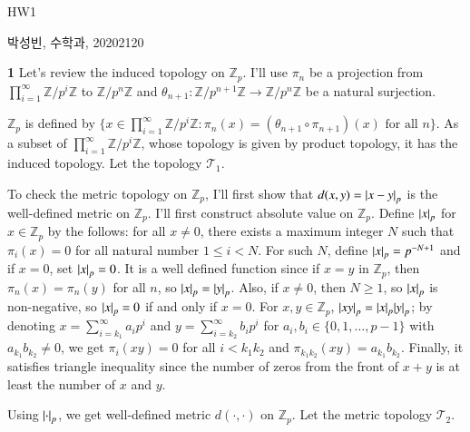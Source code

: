 \documentclass[a4paper, 12pt]{article}
\theoremstyle{Mydefinition}
\theoremstyle{Mytheorem}
\newcommand{\quotZ}[1]{\ensuremath{\mathbb{Z}/p^{#1}\mathbb{Z}}}
\begin{document}
\thispagestyle{myfirstpage}
\begin{center}
	\Large{HW1}
\end{center}
박성빈, 수학과, 20202120

\noindent \textbf{1}
Let's review the induced topology on $\mathbb{Z}_p$. I'll use $\pi_n$ be a projection from 
$\prod_{i=1}^\infty \quotZ{i}$ to $\quotZ{n}$ and $\theta_{n+1}:\quotZ{n+1}\rightarrow \quotZ{n}$ be a natural surjection.

$\mathbb{Z}_p$ is defined by $\{x\in \prod_{i=1}^\infty \quotZ{i} : \pi_n(x) = (\theta_{n+1}\circ \pi_{n+1})(x) \textrm{ for all } n\}$. As a subset of $\prod_{i=1}^\infty \quotZ{i}$, whose topology is given by product topology, it has the induced topology. Let the topology $\mathcal{T}_1$.

To check the metric topology on $\mathbb{Z}_p$, I'll first show that $d(x,y) = \abs{x-y}_p$ is the well-defined metric on $\mathbb{Z}_p$. I'll first construct absolute value on $\mathbb{Z}_p$. Define $\abs{x}_p$ for $x\in \mathbb{Z}_p$ by the follows: for all $x\neq 0$, there exists a maximum integer $N$ such that $\pi_i(x) = 0$ for all natural number $1\leq i < N$. For such $N$, define $\abs{x}_p = p^{-N+1}$ and if $x=0$, set $\abs{x}_p = 0$. It is a well defined function since if $x=y$ in $\mathbb{Z}_p$, then $\pi_n(x) = \pi_n(y)$ for all $n$, so $\abs{x}_p = \abs{y}_p$. Also, if $x\neq 0$, then $N\geq 1$, so $\abs{x}_p$ is non-negative, so $\abs{x}_p = 0$ if and only if $x=0$. For $x,y\in\mathbb{Z}_p$, $\abs{xy}_p = \abs{x}_p\abs{y}_p$; by denoting $x = \sum_{i=k_1}^\infty a_i p^i$ and $y = \sum_{i=k_2}^\infty b_i p^i$ for $a_i, b_i\in \{0, 1, \ldots, p-1\}$ with $a_{k_1}b_{k_2}\neq 0$, we get $\pi_i(xy) = 0$ for all $i<k_1k_2$ and $\pi_{k_1k_2}(xy) = a_{k_1}b_{k_2}$. Finally, it satisfies triangle inequality since the number of zeros from the front of $x+y$ is at least the number of $x$ and $y$.

Using $\abs{\cdot}_p$, we get well-defined metric $d(\cdot,\cdot)$ on $\mathbb{Z}_p$. Let the metric topology $\mathcal{T}_2$.
\end{document}
